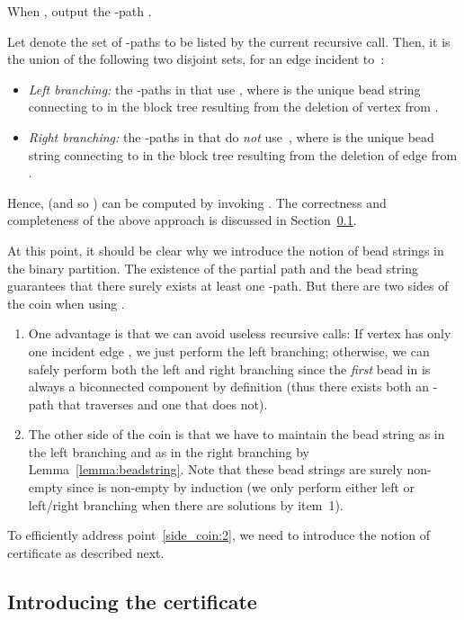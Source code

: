 When , output the -path .

\smallskip

 Let  denote the set of -paths to be
		listed by the current recursive call. Then, it is the
		union of the following two disjoint sets, for an edge
		 incident to~:
\begin{itemize}
\item \emph{Left branching:} the -paths in  that use , where  is the unique
  bead string connecting  to  in the block tree resulting from
  the deletion of vertex  from .
\item \emph{Right branching:} the -paths in  that do \emph{not} use~, where  is
  the unique bead string connecting  to  in the block tree
  resulting from the deletion of edge  from .
\end{itemize}

\noindent
Hence,  (and so
) can be computed by invoking . The correctness and completeness of the above approach
is discussed in Section~\ref{sec:intro-cert}.

At this point, it should be clear why we introduce the notion of bead
strings in the binary partition. The existence of the partial path
 and the bead string  guarantees that there surely
exists at least one -path. But there are two sides of the coin
when using .

\begin{enumerate}
\item One advantage is that we can avoid useless recursive calls:
If vertex  has only one incident edge , we just perform the left
branching; otherwise, we can safely perform both the left and right
branching since the \emph{first} bead in  is always a
biconnected component by definition (thus there exists both an
-path that traverses  and one that does not).

\item \label{side_coin:2} The other side of the coin is that we have to maintain the
bead string  as  in the left branching and
as  in the right branching by
Lemma~\ref{lemma:beadstring}. Note that these bead strings are surely
non-empty since  is non-empty by induction (we only
perform either left or left/right branching when there are solutions by
item~1).
\end{enumerate}

To efficiently address point~\ref{side_coin:2}, we need to introduce the notion of
certificate as described next. 


\subsection{Introducing the certificate}
\label{sec:intro-cert}

